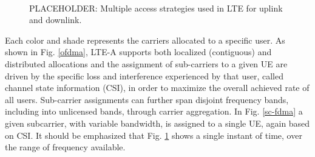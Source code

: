 \begin{figure}[!ht] 
	\centering
	\\
	\caption{PLACEHOLDER: Multiple access strategies used in LTE for uplink and downlink.}
	\label{lte:of-sc-fdma}
\end{figure}
Each color and shade represents the carriers allocated to a specific user.  As shown in Fig. \ref{ofdma}, LTE-A supports both localized (contiguous) and distributed allocations and the assignment of sub-carriers to a given UE are driven by the specific loss and interference experienced by that user, called channel state information (CSI), in order to maximize the overall achieved rate of all users.  Sub-carrier assignments can further span disjoint frequency bands, including into unlicensed bands, through carrier aggregation.  In Fig. \ref{sc-fdma} a given subcarrier, with variable bandwidth, is assigned to a single UE, again based on CSI.  It should be emphasized that Fig. \ref{lte:of-sc-fdma} shows a single instant of time, over the range of frequency available. 

